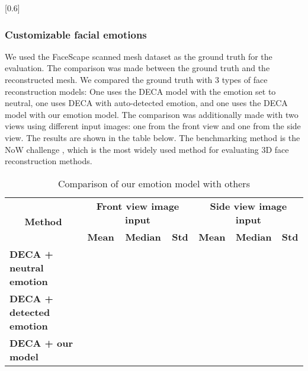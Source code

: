 [0.6]

\subsubsection{Customizable facial emotions}

We used the FaceScape scanned mesh dataset as the ground truth for the evaluation. The comparison was made between the ground truth and the reconstructed mesh. We compared the ground truth with 3 types of face reconstruction models: One uses the DECA model with the emotion set to neutral, one uses DECA with auto-detected emotion, and one uses the DECA model with our emotion model. The comparison was additionally made with two views using different input images: one from the front view and one from the side view. The results are shown in the table below. The benchmarking method is the NoW challenge \cite{RingNet:CVPR:2019}, which is the most widely used method for evaluating 3D face reconstruction methods.

\begin{table}[H]
    \centering
    \captionsetup{font=bf}
    \caption{Comparison of our emotion model with others}
    \begin{tabular}{|l|ccc|ccc|}
        \hline
        \multicolumn{1}{|c|}{\multirow{2}{*}{\textbf{Method}}} & \multicolumn{3}{c|}{\textbf{Front view image input}} & \multicolumn{3}{c|}{\textbf{Side view image input}}                                                                                                           \\ \cline{2-7}
        \multicolumn{1}{|c|}{}                                 & \multicolumn{1}{c|}{\textbf{Mean}}                   & \multicolumn{1}{c|}{\textbf{Median}}                & \textbf{Std} & \multicolumn{1}{c|}{\textbf{Mean}} & \multicolumn{1}{c|}{\textbf{Median}} & \textbf{Std} \\ \hline
        \textbf{DECA + neutral emotion}                        & \multicolumn{1}{c|}{}                                & \multicolumn{1}{c|}{}                               &              & \multicolumn{1}{c|}{}              & \multicolumn{1}{c|}{}                &              \\ \hline
        \textbf{DECA + detected emotion}                       & \multicolumn{1}{c|}{}                                & \multicolumn{1}{c|}{}                               &              & \multicolumn{1}{c|}{}              & \multicolumn{1}{c|}{}                &              \\ \hline
        \textbf{DECA + our model}                              & \multicolumn{1}{c|}{}                                & \multicolumn{1}{c|}{}                               &              & \multicolumn{1}{c|}{}              & \multicolumn{1}{c|}{}                &              \\ \hline
    \end{tabular}
    \label{now_results}
\end{table}
